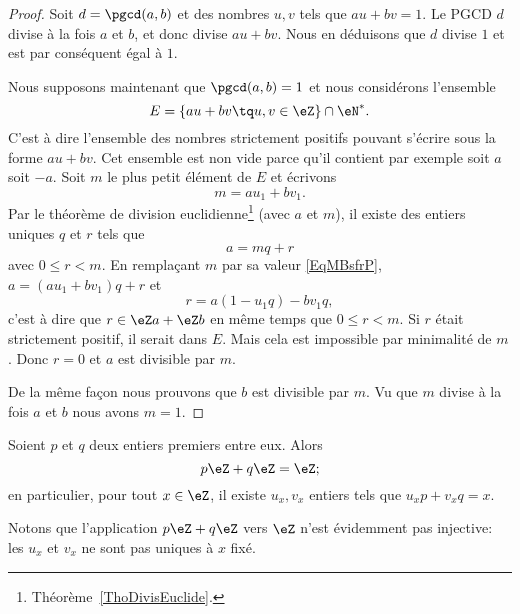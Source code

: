 \begin{proof}
    Soit \( d=\pgcd(a,b)\) et des nombres \( u,v\) tels que \( au+bv=1\). Le PGCD \( d\) divise à la fois \( a\) et \( b\), et donc divise \( au+bv\). Nous en déduisons que \( d\) divise \( 1\) et est par conséquent égal à \( 1\).

    Nous supposons maintenant que \( \pgcd(a,b)=1\) et nous considérons l'ensemble
    \begin{equation}
        E=\{ au+bv\tq u,v\in \eZ \}\cap \eN^*.
    \end{equation}
    C'est à dire l'ensemble des nombres strictement positifs pouvant s'écrire sous la forme \( au+bv\). Cet ensemble est non vide parce qu'il contient par exemple soit \( a\) soit \( -a\). Soit \( m\) le plus petit élément de \( E\) et écrivons
    \begin{equation}    \label{EqMBsfrP}
        m=au_1+bv_1.
    \end{equation}
    Par le théorème de division euclidienne\footnote{Théorème~\ref{ThoDivisEuclide}.} (avec \( a\) et \( m\)), il existe des entiers uniques $q$ et $r$ tels que
    \begin{equation}
        a=mq+r
    \end{equation}
    avec \( 0\leq r<m\). En remplaçant \( m\) par sa valeur \eqref{EqMBsfrP}, \( a=(au_1+bv_1)q+r\) et
    \begin{equation}
        r=a(1-u_1q)-bv_1q,
    \end{equation}
    c'est à dire que \( r\in \eZ a+\eZ b\) en même temps que \( 0\leq r<m\). Si \( r\) était strictement positif, il serait dans \( E\). Mais cela est impossible par minimalité de \( m\). Donc \( r=0\) et \( a\) est divisible par \( m\).

    De la même façon nous prouvons que \( b\) est divisible par \( m\). Vu que \( m\) divise à la fois \( a\) et \( b\) nous avons \( m=1\).
\end{proof}

\begin{corollary}       \label{CorgEMtLj}
    Soient \( p\) et \( q\) deux entiers premiers entre eux. Alors
    \begin{equation}
        p\eZ+q\eZ=\eZ;
    \end{equation}
    en particulier, pour tout \( x \in \eZ \), il existe \( u_x, v_x \) entiers tels que \(u_x p + v_x q = x \).
\end{corollary}

Notons que l'application \( p\eZ+q\eZ\) vers \( \eZ\) n'est évidemment pas injective: les $u_x$ et $v_x$ ne sont pas uniques à $x$ fixé.

